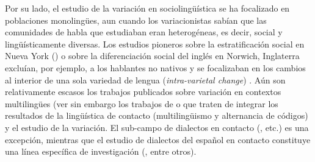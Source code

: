 \documentclass[output=paper]{langscibook}
\begin{document}
Por su lado, el estudio de la variación en sociolingüística se ha focalizado en poblaciones monolingües, aun cuando los variacionistas sabían que las comunidades de habla que estudiaban eran heterogéneas, es decir, social y lingüísticamente diversas. Los estudios pioneros sobre la estratificación social en Nueva York (\citealt{Labov1966,Labov1972book}) o sobre la diferenciación social del inglés en Norwich, Inglaterra \citep{Trudgill1974} excluían, por ejemplo, a los hablantes no nativos y se focalizaban en los cambios al interior de una sola variedad de lengua (\textit{intra-varietal change}) \citep[20]{Labov1994}. Aún son relativamente escasos los trabajos publicados sobre variación en contextos multilingües (ver sin embargo los trabajos de \citet{MeyerhoffNagy2008} o \citet{LégliseChamoreau2013} que traten de integrar los resultados de la lingüística de contacto (multilingüismo y alternancia de códigos) y el estudio de la variación. El sub-campo de dialectos en contacto (\citealt{Gumperz1958,Trudgill1986,Siegel1987,Mesthrie1993,AuerEtAl2005}, etc.) es una excepción, mientras que el estudio de dialectos del español en contacto constituye una línea específica de investigación (\citealt{Elizaincín1992,Butragueño2017,Penny2000,PesqueiraButragueño2012}, entre otros).
\end{document}
